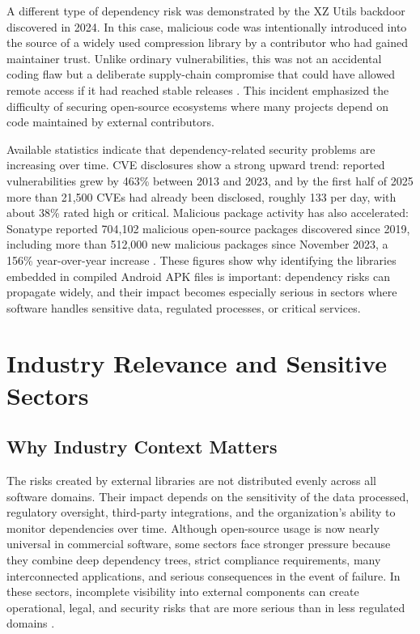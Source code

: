\documentclass[12pt,a4paper]{report}
\begin{document}
A different type of dependency risk was demonstrated by the XZ Utils backdoor discovered in 2024. In this case, malicious code was intentionally introduced into the source of a widely used compression library by a contributor who had gained maintainer trust. Unlike ordinary vulnerabilities, this was not an accidental coding flaw but a deliberate supply-chain compromise that could have allowed remote access if it had reached stable releases \parencite{freireUnderstandingRedHats}. This incident emphasized the difficulty of securing open-source ecosystems where many projects depend on code maintained by external contributors.

Available statistics indicate that dependency-related security problems are increasing over time. CVE disclosures show a strong upward trend: reported vulnerabilities grew by 463\% between 2013 and 2023, and by the first half of 2025 more than 21,500 CVEs had already been disclosed, roughly 133 per day, with about 38\% rated high or critical. Malicious package activity has also accelerated: Sonatype reported 704,102 malicious open-source packages discovered since 2019, including more than 512,000 new malicious packages since November 2023, a 156\% year-over-year increase \parencite{OpenSourceMalware2025,VulnerabilitiesStatistics20252025}. These figures show why identifying the libraries embedded in compiled Android APK files is important: dependency risks can propagate widely, and their impact becomes especially serious in sectors where software handles sensitive data, regulated processes, or critical services.

\chapter{Industry Relevance and Sensitive Sectors}

\section{Why Industry Context Matters}
The risks created by external libraries are not distributed evenly across all software domains. Their impact depends on the sensitivity of the data processed, regulatory oversight, third-party integrations, and the organization’s ability to monitor dependencies over time. Although open-source usage is now nearly universal in commercial software, some sectors face stronger pressure because they combine deep dependency trees, strict compliance requirements, many interconnected applications, and serious consequences in the event of failure. In these sectors, incomplete visibility into external components can create operational, legal, and security risks that are more serious than in less regulated domains \parencite{OpenSourceSecurity2026,2024StateOpen2024,2026StateSoftware2026}.
\end{document}
